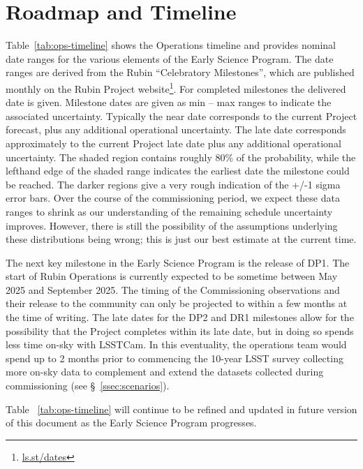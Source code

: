 \section{Roadmap and Timeline} \label{sec:timeline}

Table~\ref{tab:ops-timeline} shows the Operations timeline and provides nominal date ranges for the various elements of the Early Science Program.
The date ranges are derived from the Rubin ``Celebratory Milestones'', which are  published monthly on the Rubin Project website\footnote{\url{ls.st/dates}}. 
For completed milestones the delivered date is given. 
Milestone dates are given as min -- max ranges to indicate the associated uncertainty. 
Typically the near date corresponds to the current Project forecast, plus any additional operational uncertainty.
The late date corresponds approximately to the current Project late date plus any additional operational uncertainty.
The shaded region contains roughly 80\% of the probability, while the lefthand edge of the shaded range indicates the earliest date the milestone could be reached. 
The darker regions give a very rough indication of the +/-1 sigma error bars.
Over the course of the commissioning period, we expect these data ranges to shrink as our understanding of the remaining schedule uncertainty improves. 
However, there is still the possibility of the assumptions underlying these distributions being wrong; this is just our best estimate at the current time.



The next key milestone in the Early Science Program is the release of DP1.
The  start of Rubin Operations is currently expected to be sometime between May 2025 and September 2025.
The timing of the Commissioning observations and their release to the community can only be projected to within a few months at the time of writing.
The late dates for the DP2 and DR1 milestones allow for the possibility that the Project completes within its late date, but in doing so spends less time on-sky with LSSTCam.
In this eventuality, the operations team would spend up to 2 months prior to commencing the 10-year LSST survey collecting more on-sky data to complement and extend the datasets collected during commissioning (see \S~\ref{ssec:scenarios}). 

Table ~\ref{tab:ops-timeline} will continue to be refined and updated in future version of this document as the Early Science Program progresses.